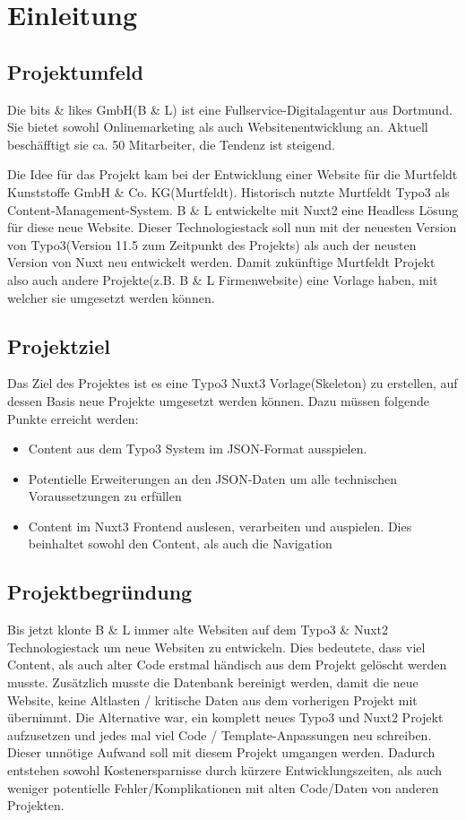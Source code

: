 \section{Einleitung}
\label{sec:Einleitung}


\subsection{Projektumfeld} 
\label{sec:Projektumfeld}
Die bits \& likes GmbH(B \& L) ist eine Fullservice-Digitalagentur aus Dortmund. Sie bietet sowohl Onlinemarketing als auch Websitenentwicklung an. Aktuell beschäfftigt sie ca. 50 Mitarbeiter, die Tendenz ist steigend.

Die Idee für das Projekt kam bei der Entwicklung einer Website für die Murtfeldt Kunststoffe GmbH \& Co. KG(Murtfeldt). Historisch nutzte Murtfeldt Typo3 als Content-Management-System. B \& L entwickelte mit Nuxt2 eine Headless Lösung für diese neue Website. Dieser Technologiestack soll nun mit der neuesten Version von Typo3(Version 11.5 zum Zeitpunkt des Projekts) als auch der neusten Version von Nuxt neu entwickelt werden. Damit zukünftige Murtfeldt Projekt also auch andere Projekte(z.B. B \& L Firmenwebsite) eine Vorlage haben, mit welcher sie umgesetzt werden können.


\subsection{Projektziel} 
\label{sec:Projektziel}
Das Ziel des Projektes ist es eine Typo3 Nuxt3 Vorlage(Skeleton) zu erstellen, auf dessen Basis neue Projekte umgesetzt werden können. Dazu müssen folgende Punkte erreicht werden:
\begin{itemize}
	\item Content aus dem Typo3 System im JSON-Format ausspielen.
	\item Potentielle Erweiterungen an den JSON-Daten um alle technischen Voraussetzungen zu erfüllen
	\item Content im Nuxt3 Frontend auslesen, verarbeiten und auspielen. Dies beinhaltet sowohl den Content, als auch die Navigation
\end{itemize}

\subsection{Projektbegründung} 
\label{sec:Projektbegruendung}
Bis jetzt klonte B \& L immer alte Websiten auf dem Typo3 \& Nuxt2 Technologiestack um neue Websiten zu entwickeln. Dies bedeutete, dass viel Content, als auch alter Code erstmal händisch aus dem Projekt gelöscht werden musste. Zusätzlich musste die Datenbank bereinigt werden, damit die neue Website, keine Altlasten / kritische Daten aus dem vorherigen Projekt mit übernimmt. Die Alternative war, ein komplett neues Typo3 und Nuxt2 Projekt aufzusetzen und jedes mal viel Code / Template-Anpassungen neu schreiben. Dieser unnötige Aufwand soll mit diesem Projekt umgangen werden. Dadurch entstehen sowohl Kostenersparnisse durch kürzere Entwicklungszeiten, als auch weniger potentielle Fehler/Komplikationen mit alten Code/Daten von anderen Projekten.


